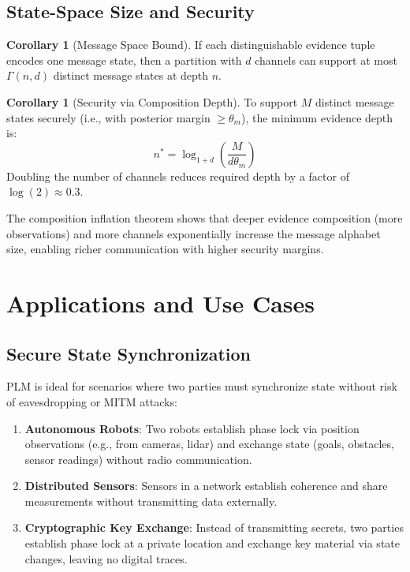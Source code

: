 \documentclass[11pt,a4paper]{article}
\theoremstyle{definition}
\newtheorem{corollary}[definition]{Corollary}
\begin{document}
\subsection{State-Space Size and Security}

\begin{corollary}[Message Space Bound]
If each distinguishable evidence tuple encodes one message state, then a partition with $d$ channels can support at most $\Gamma(n, d)$ distinct message states at depth $n$.
\end{corollary}

\begin{corollary}[Security via Composition Depth]
To support $M$ distinct message states securely (i.e., with posterior margin $\geq \theta_m$), the minimum evidence depth is:
\[
n^* = \log_{1+d}\left(\frac{M}{d\theta_m}\right)
\]
Doubling the number of channels reduces required depth by a factor of $\log(2) \approx 0.3$.
\end{corollary}

The composition inflation theorem shows that deeper evidence composition (more observations) and more channels exponentially increase the message alphabet size, enabling richer communication with higher security margins.

\section{Applications and Use Cases}
\label{sec:applications}

\subsection{Secure State Synchronization}

PLM is ideal for scenarios where two parties must synchronize state without risk of eavesdropping or MITM attacks:

\begin{enumerate}
\item \textbf{Autonomous Robots}: Two robots establish phase lock via position observations (e.g., from cameras, lidar) and exchange state (goals, obstacles, sensor readings) without radio communication.
\item \textbf{Distributed Sensors}: Sensors in a network establish coherence and share measurements without transmitting data externally.
\item \textbf{Cryptographic Key Exchange}: Instead of transmitting secrets, two parties establish phase lock at a private location and exchange key material via state changes, leaving no digital traces.
\end{enumerate}
\end{document}
